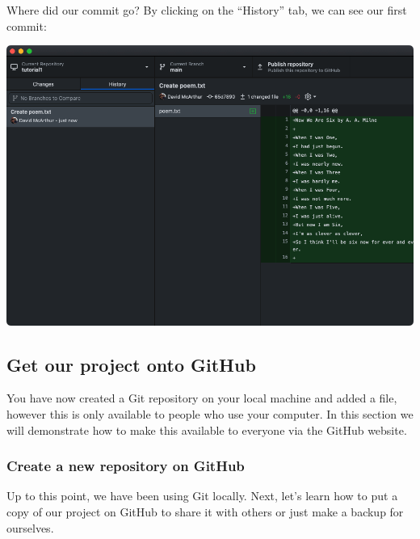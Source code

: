 \documentclass[
  letterpaper,
  DIV=11,
  numbers=noendperiod]{scrartcl}
\begin{document}
Where did our commit go? By clicking on the ``History'' tab, we can see
our first commit:

\includegraphics{images/image13.png}

\subsection{Get our project onto
GitHub}\label{get-our-project-onto-github}

You have now created a Git repository on your local machine and added a
file, however this is only available to people who use your computer. In
this section we will demonstrate how to make this available to everyone
via the GitHub website.

\subsubsection{Create a new repository on
GitHub}\label{create-a-new-repository-on-github}

Up to this point, we have been using Git locally. Next, let's learn how
to put a copy of our project on GitHub to share it with others or just
make a backup for ourselves.
\end{document}
